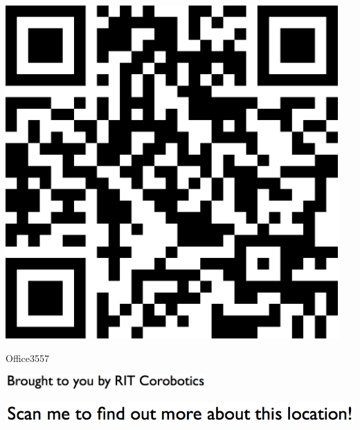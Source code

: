 \documentclass[letterpaper]{article}
\begin{document}
 \begingroup 
 \centerline{\includegraphics[scale=1,width=5in,height=5in]{Office3557.png}} 
 \endgroup 
 \vspace*{\fill} 

 \hfill{\small Office3557} 

  \vspace{0.7in} 
 
 \centerline{\includegraphics[scale=1,width=3in]{text-bottom.png}} 
 
 \pagebreak 
{} 
 \vspace*{\fill} 
 
  \centerline{\includegraphics[scale=1,width=6in]{text-top.png}} 
 
 \vspace{0.5in} 
 
\end{document}
